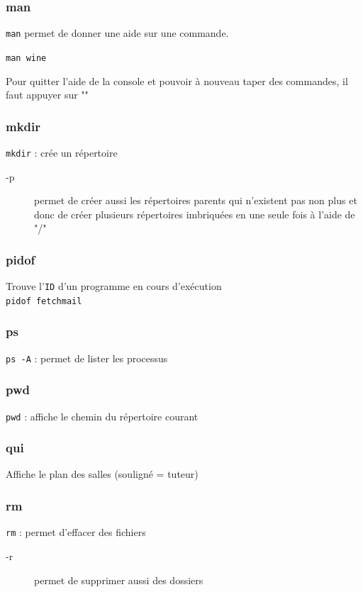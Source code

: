 \documentclass[a4paper,twoside]{article}
\begin{document}
\subsubsection{man}

\verb|man| permet de donner une aide sur une commande.

\begin{exemple}
\texttt{man wine}
\end{exemple}


Pour quitter l'aide de la console et pouvoir à nouveau taper des commandes, il faut appuyer sur ""

\subsubsection{mkdir}
\verb|mkdir| : crée un répertoire
\begin{description}
 \item[-p] permet de créer aussi les répertoires parents qui n'existent pas non plus et donc de créer plusieurs répertoires imbriquées en une seule fois à l'aide de "/"
\end{description}

\subsubsection{pidof}
Trouve l'\texttt{ID} d'un programme en cours d'exécution\\
\verb|pidof fetchmail|

\subsubsection{ps}
\verb|ps -A| : permet de lister les processus

\subsubsection{pwd}
\verb|pwd| : affiche le chemin du répertoire courant

\subsubsection{qui}
Affiche le plan des salles (souligné = tuteur)

\subsubsection{rm}
\verb|rm| : permet d'effacer des fichiers
\begin{description}
 \item[-r] permet de supprimer aussi des dossiers
\end{description}
\end{document}
